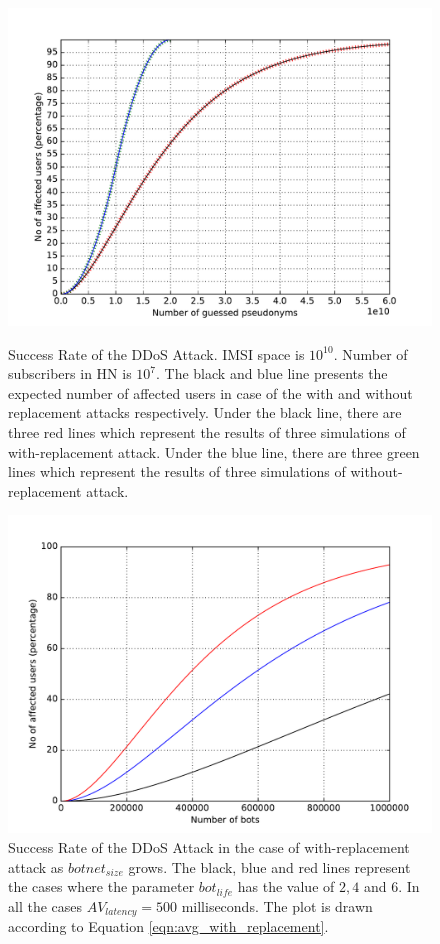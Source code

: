 \documentclass{llncs} %
\begin{document}
\begin{figure}[!tbp]
  \centering
  \begin{minipage}[b]{0.8\textwidth}
    \includegraphics[width=\textwidth]{sim_and_mod.pdf}
   \caption{Success Rate of the DDoS Attack. IMSI space is $10^{10}$. Number of subscribers in HN is $10^7$. The black and blue line presents the expected number of affected users in case of the with and without replacement attacks respectively. Under the black line, there are three red lines which represent the results of three simulations of with-replacement attack. Under the blue line, there are three green lines which represent the results of three simulations of without-replacement attack.}
\label{fig:simulation_and_modeling}
  \end{minipage}
  \hfill
  \begin{minipage}[b]{0.8\textwidth}
    \includegraphics[width=\textwidth]{botplot.pdf}
  \caption{Success Rate of the DDoS Attack in the case of with-replacement attack as $botnet_{size}$ grows. The black, blue and red lines represent the cases where the parameter $bot_{life}$ has the value of $2, 4$ and $6$. In all the cases $AV_{latency} = 500$ milliseconds. The plot is drawn according to Equation \ref{eqn:avg_with_replacement}.}
  \label{fig:botplot}
  \end{minipage}
\end{figure}
\end{document}
